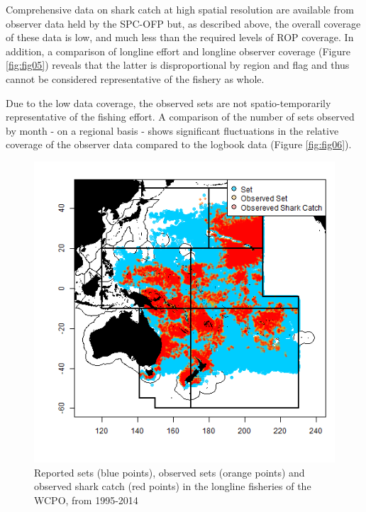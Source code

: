 \documentclass[12pt]{SCreport}
\begin{document}
Comprehensive data on shark catch at high spatial resolution are available from observer data held by the SPC-OFP but, as described above, the overall coverage of these data is low, and much less than the required levels of ROP coverage. In addition, a comparison of longline effort and longline observer coverage (Figure \ref{fig:fig05}) reveals that the latter is disproportional by region and flag and thus cannot be considered representative of the fishery as whole.

Due to the low data coverage, the observed sets are not spatio-temporarily representative of the fishing effort. A comparison of the number of sets observed by month - on a regional basis - shows significant fluctuations in the relative coverage of the observer data compared to the logbook data (Figure \ref{fig:fig06}).


\begin{figure}
\begin{center}
\includegraphics[scale=0.95]{../GRAPHICS/Defined/FIG_02_MAP_sets}
\caption{\label{fig:fig02} Reported sets (blue points), observed sets (orange points) and observed shark catch (red points) in the longline fisheries of the WCPO, from 1995-2014}
\end{center}
\end{figure}
\end{document}
